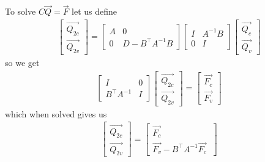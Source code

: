 \documentclass{article}
\begin{document}
To solve $C\vec{Q}=\vec{F}$ let us define 
\begin{align*}
\begin{bmatrix} 
\vec{Q_{2c}} \\ 
\vec{Q_{2v}}
\end{bmatrix}   
=
\begin{bmatrix} 
A & 0 \\ 
0 & D - B^{\top}A^{-1}B
\end{bmatrix}   
\begin{bmatrix} 
I & A^{-1}B \\ 
0 & I
\end{bmatrix}
\begin{bmatrix} 
\vec{Q_c} \\ 
\vec{Q_v}
\end{bmatrix}   
\end{align*}
so we get
\begin{align*}
\begin{bmatrix} 
I & 0 \\ 
B^{\top}A^{-1} & I
\end{bmatrix}   
\begin{bmatrix} 
\vec{Q_{2c}} \\ 
\vec{Q_{2v}}
\end{bmatrix}   
= 
\begin{bmatrix} 
\vec{F_c} \\ 
\vec{F_v}
\end{bmatrix}
\end{align*}
which when solved gives us
\begin{align*}
\begin{bmatrix} 
\vec{Q_{2c}} \\ 
\vec{Q_{2v}}
\end{bmatrix}
=\begin{bmatrix} 
\vec{F_c} \\ 
\vec{F_v} - B^{\top}A^{-1}\vec{F_c}\
\end{bmatrix} 
\end{align*} 
\end{document}
